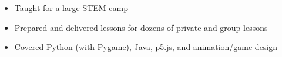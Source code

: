 {
	\begin{itemize}
		\item Taught for a large STEM camp
		\item Prepared and delivered lessons for dozens of private and group lessons
		\item Covered Python (with Pygame), Java, p5.js, and animation/game design
	\end{itemize}
}
